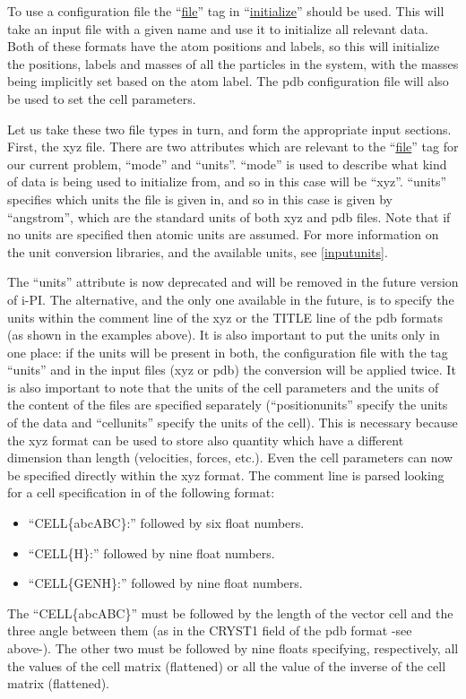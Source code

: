 \documentclass[11pt,english,fleqn]{report}
\begin{document}
To use a configuration file the {}``\hyperref[INITFILE]{file}'' tag in 
{}``\hyperref[INITIALIZER]{initialize}'' should be used.
This will take an input file with a given name and use it to initialize
all relevant data. Both of these formats have the atom
positions and labels, so this will initialize the positions, labels
and masses of all the particles in the system, with the masses being
implicitly set based on the atom label. The pdb configuration file
will also be used to set the cell parameters.

Let us take these two file types in turn, and form the appropriate
input sections. First, the xyz file. 
There are two attributes which are 
relevant to the {}``\hyperref[INITFILE]{file}'' tag
for our current problem, {}``mode'' and {}``units''.
{}``mode'' is used to describe what kind of data is being used to
initialize from, and so in this case will be {}``xyz''.
{}``units'' specifies which units the file is given in, and
so in this case is given by {}``angstrom'', which are the
standard units of both xyz and pdb files. 
Note that if no units are specified then atomic units are assumed.
For more information on the \ipi unit conversion libraries, 
and the available units, see \ref{inputunits}.

The {}``units'' attribute is now deprecated and will be removed in the
future version of i-PI. The alternative, and the only one available in
the future, is to specify the units within the comment line of the xyz
or the TITLE line of the pdb formats (as shown in the examples
above). It is also important to put the units only in one place: if
the units will be present in both, the configuration file with the tag
{}``units'' and in the input files (xyz or pdb) the conversion will be
applied twice. It is also important to note that the units of the cell
parameters and the units of the content of the files are specified
separately ({}``position{units}'' specify the units of the data and
{}``cell{units}'' specify the units of the cell). This is necessary
because the xyz format can be used to 
store also quantity which have a different dimension than length
(velocities, forces, etc.). Even the cell parameters can now be specified
directly within the xyz format. The comment line is parsed looking for
a cell specification in of the following format:
\begin{itemize}
\item ``CELL\{abcABC\}:'' followed by six float numbers.
\item ``CELL\{H\}:'' followed by nine float numbers.
\item ``CELL\{GENH\}:'' followed by nine float numbers.
\end{itemize}
The {}``CELL\{abcABC\}'' must be followed by the length of the vector
cell and the three angle between them (as in the CRYST1 field of the
pdb format -see above-). The other two must be followed
by nine floats specifying, respectively, all the values of the cell
matrix (flattened) or all the value of the inverse of the cell matrix
(flattened).
\end{document}
